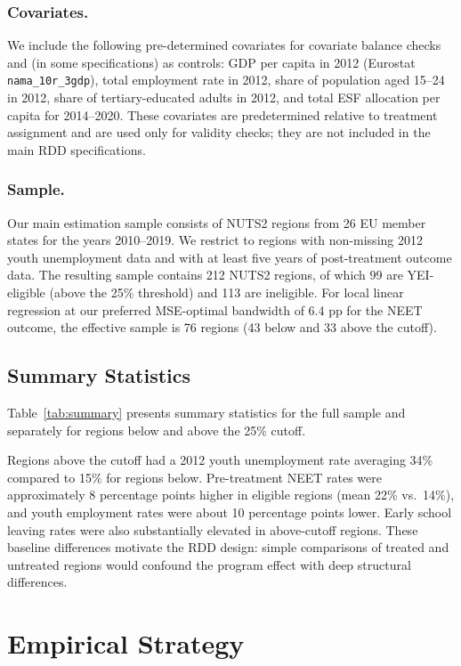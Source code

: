 \documentclass[12pt]{article}
\begin{document}
\subsubsection*{Covariates.} We include the following pre-determined covariates for covariate balance checks and (in some specifications) as controls: GDP per capita in 2012 (Eurostat \texttt{nama\_10r\_3gdp}), total employment rate in 2012, share of population aged 15--24 in 2012, share of tertiary-educated adults in 2012, and total ESF allocation per capita for 2014--2020. These covariates are predetermined relative to treatment assignment and are used only for validity checks; they are not included in the main RDD specifications.

\subsubsection*{Sample.} Our main estimation sample consists of NUTS2 regions from 26 EU member states for the years 2010--2019. We restrict to regions with non-missing 2012 youth unemployment data and with at least five years of post-treatment outcome data. The resulting sample contains 212 NUTS2 regions, of which 99 are YEI-eligible (above the 25\% threshold) and 113 are ineligible. For local linear regression at our preferred MSE-optimal bandwidth of 6.4 pp for the NEET outcome, the effective sample is 76 regions (43 below and 33 above the cutoff).

\subsection{Summary Statistics}

Table~\ref{tab:summary} presents summary statistics for the full sample and separately for regions below and above the 25\% cutoff.



Regions above the cutoff had a 2012 youth unemployment rate averaging 34\% compared to 15\% for regions below. Pre-treatment NEET rates were approximately 8 percentage points higher in eligible regions (mean 22\% vs.\ 14\%), and youth employment rates were about 10 percentage points lower. Early school leaving rates were also substantially elevated in above-cutoff regions. These baseline differences motivate the RDD design: simple comparisons of treated and untreated regions would confound the program effect with deep structural differences.

\section{Empirical Strategy}
\end{document}
